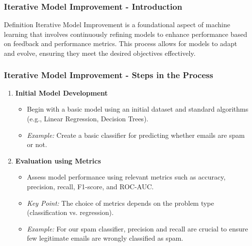 \documentclass[aspectratio=169]{beamer}
\begin{document}
\begin{frame}[fragile]
    \frametitle{Iterative Model Improvement - Introduction}
    \begin{block}{Definition}
        Iterative Model Improvement is a foundational aspect of machine learning that involves continuously refining models to enhance performance based on feedback and performance metrics. This process allows for models to adapt and evolve, ensuring they meet the desired objectives effectively.
    \end{block}
\end{frame}

\begin{frame}[fragile]
    \frametitle{Iterative Model Improvement - Steps in the Process}
    \begin{enumerate}
        \item \textbf{Initial Model Development}
        \begin{itemize}
            \item Begin with a basic model using an initial dataset and standard algorithms (e.g., Linear Regression, Decision Trees).
            \item \textit{Example:} Create a basic classifier for predicting whether emails are spam or not.
        \end{itemize}

        \item \textbf{Evaluation using Metrics}
        \begin{itemize}
            \item Assess model performance using relevant metrics such as accuracy, precision, recall, F1-score, and ROC-AUC.
            \item \textit{Key Point:} The choice of metrics depends on the problem type (classification vs. regression).
            \item \textit{Example:} For our spam classifier, precision and recall are crucial to ensure few legitimate emails are wrongly classified as spam.
        \end{itemize}
    \end{enumerate}
\end{frame}
\end{document}
